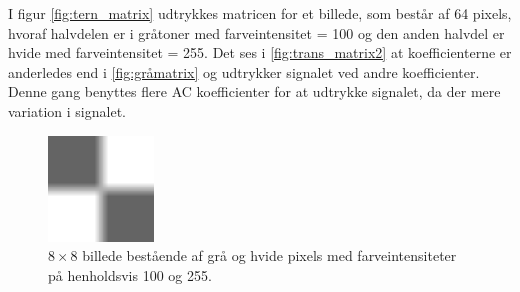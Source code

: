 I figur \ref{fig:tern_matrix} udtrykkes matricen for et billede, som består af 64 pixels, hvoraf halvdelen er i gråtoner med farveintensitet = 100 og den anden halvdel er hvide med farveintensitet = 255. Det ses i \ref{fig:trans_matrix2} at koefficienterne er anderledes end i \ref{fig:gråmatrix} og udtrykker signalet ved andre koefficienter. Denne gang benyttes flere AC koefficienter for at udtrykke signalet, da der mere variation i signalet.
\begin{figure}[htbp]
\centering
\includegraphics[width=0.25\textwidth]{Billeder/8x8_eks3.png}
\caption{$8\times8$ billede bestående af grå og hvide pixels med farveintensiteter på henholdsvis 100 og 255.}
\label{fig:8x8halvgraa}
\end{figure}

